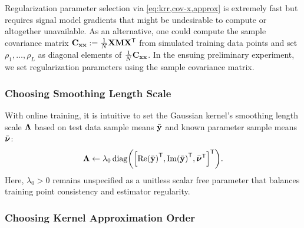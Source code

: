 Regularization parameter selection 
via \eqref{eq:krr,cov-x,approx}
is extremely fast
but requires signal model gradients
that might be undesirable to compute
or altogether unavailable.
As an alternative,
one could compute the sample covariance matrix
$\mathbf{C}_{\mathbf{x}\mathbf{x}} := \frac{1}{N}\mathbf{X} \mathbf{M} \mathbf{X}^{\mathsf{T}}$
from simulated training data points 
and set $\rho_1,\dots,\rho_L$
as diagonal elements of $\frac{1}{N}\mathbf{C}_{\mathbf{x}\mathbf{x}}$.
In the ensuing preliminary experiment,
we set regularization parameters
using the sample covariance matrix.

\subsubsection{Choosing Smoothing Length Scale}
\label{sss,krr,pract,mod,lam}

With online training,
it is intuitive
to set the Gaussian kernel's 
smoothing length scale $\boldsymbol{\Lambda}$
based on test data sample means $\bar{\mathbf{y}}$
and known parameter sample means $\bar{\boldsymbol{\nu}}$:
\begin{align}
	\bmL \gets \lambda_0 
	\diag{\brac{\re{\bar{\bmy}}\tpose, \im{\bar{\bmy}}\tpose, \nubar\tpose}\tpose}.
	\label{eq:krr,length}
\end{align}
Here, $\lambda_0>0$ remains unspecified
as a unitless scalar free parameter
that balances training point consistency 
and estimator regularity.

\subsubsection{Choosing Kernel Approximation Order}
\label{sss,krr,pract,mod,h}


